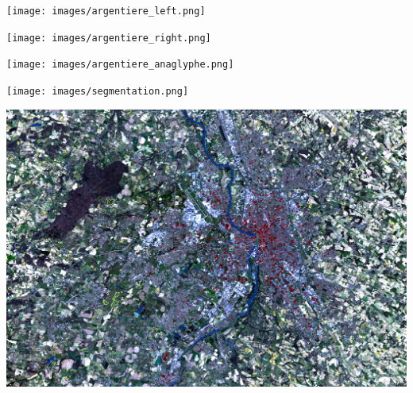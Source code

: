 \documentclass[8pt]{beamer}
\begin{document}
\vspace*{-6.5mm}
\begin{frame}[plain]
\hspace*{-11mm}
    \texttt{[image: images/argentiere\_left.png]}
\end{frame}

\vspace*{-6.5mm}
\begin{frame}[plain]
\hspace*{-11mm}
    \texttt{[image: images/argentiere\_right.png]}
\end{frame}

\vspace*{-6.5mm}
\begin{frame}[plain]
\hspace*{-11mm}
    \texttt{[image: images/argentiere\_anaglyphe.png]}
\end{frame}

\vspace*{-6.5mm}
\begin{frame}[plain]
\hspace*{-11mm}
    \texttt{[image: images/segmentation.png]}
\end{frame}

\vspace*{-6.5mm}
\begin{frame}[plain]
\hspace*{-11mm}
    \includegraphics[keepaspectratio,height=1.1\paperheight]{../../Courses/org/WorkshopGuide/Images/samples_selection.png}
\end{frame}
\end{document}
